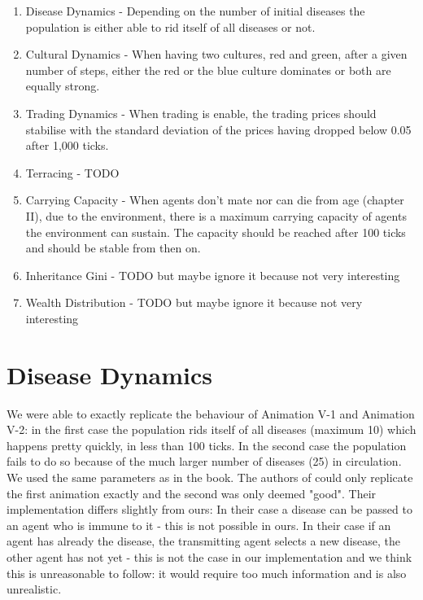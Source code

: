 \begin{enumerate}
	\item Disease Dynamics - Depending on the number of initial diseases the population is either able to rid itself of all diseases or not.
	
	\item Cultural Dynamics - When having two cultures, red and green, after a given number of steps, either the red or the blue culture dominates or both are equally strong.
	
	\item Trading Dynamics - When trading is enable, the trading prices should stabilise with the standard deviation of the prices having dropped below 0.05 after 1,000 ticks.
	
	\item Terracing - TODO
		
	\item Carrying Capacity - When agents don't mate nor can die from age (chapter II), due to the environment, there is a maximum carrying capacity of agents the environment can sustain. The capacity should be reached after 100 ticks and should be stable from then on.
			
	\item Inheritance Gini - TODO but maybe ignore it because not very interesting

	\item Wealth Distribution - TODO but maybe ignore it because not very interesting
\end{enumerate}

\section{Disease Dynamics}
We were able to exactly replicate the behaviour of Animation V-1 and Animation V-2: in the first case the population rids itself of all diseases (maximum 10) which happens pretty quickly, in less than 100 ticks. In the second case the population fails to do so because of the much larger number of diseases (25) in circulation. We used the same parameters as in the book. 
The authors of \cite{weaver_replicating_2009} could only replicate the first animation exactly and the second was only deemed "good". Their implementation differs slightly from ours: In their case a disease can be passed to an agent who is immune to it - this is not possible in ours. In their case if an agent has already the disease, the transmitting agent selects a new disease, the other agent has not yet - this is not the case in our implementation and we think this is unreasonable to follow: it would require too much information and is also unrealistic.

